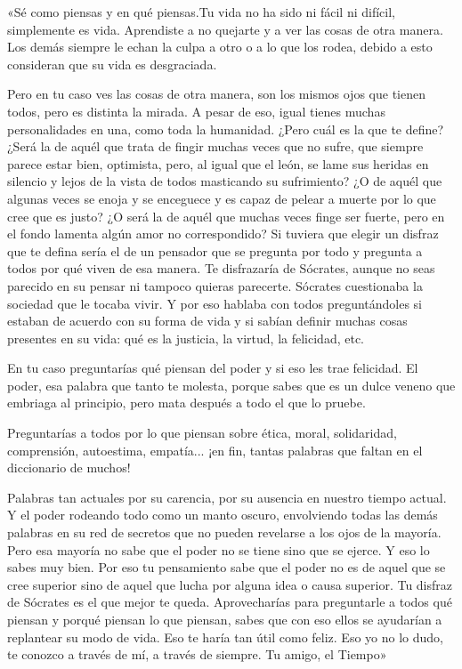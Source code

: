 \documentclass[11pt,twoside,openright,a5paper]{book}
\begin{document}
«Sé como piensas y en qué piensas.Tu vida no ha sido ni fácil ni difícil, simplemente es vida. Aprendiste a no quejarte y a ver las cosas de otra manera. Los demás siempre le echan la culpa a otro o a lo que los rodea, debido a esto consideran que su vida es desgraciada.

Pero en tu caso ves las cosas de otra manera, son los mismos ojos que tienen todos, pero es distinta la mirada. A pesar de eso, igual tienes muchas personalidades en una, como toda la humanidad. ¿Pero cuál es la que te define? ¿Será la de aquél que trata de fingir muchas veces que no sufre, que siempre parece estar bien, optimista, pero, al igual que el león, se lame sus heridas en silencio y lejos de la vista de todos masticando su sufrimiento? ¿O de aquél que algunas veces se enoja y se enceguece y es capaz de pelear a muerte por lo que cree que es justo? ¿O será la de aquél que muchas veces finge ser fuerte, pero en el fondo lamenta algún amor no correspondido? Si tuviera que elegir un disfraz que te defina sería el de un pensador que se pregunta por todo y pregunta a todos por qué viven de esa manera. Te disfrazaría de Sócrates, aunque no seas parecido en su pensar ni tampoco quieras parecerte. Sócrates cuestionaba la sociedad que le tocaba vivir. Y por eso hablaba con todos preguntándoles si estaban de acuerdo con su forma de vida y si sabían definir muchas cosas presentes en su vida: qué es la justicia, la virtud, la felicidad, etc.

En tu caso preguntarías qué piensan del poder y si eso les trae felicidad. El poder, esa palabra que tanto te molesta, porque sabes que es un dulce veneno que embriaga al principio, pero mata después a todo el que lo pruebe.

Preguntarías a todos por lo que piensan sobre ética, moral, solidaridad, comprensión, autoestima, empatía... ¡en fin, tantas palabras que faltan en el diccionario de muchos! 

Palabras tan actuales por su carencia, por su ausencia en nuestro tiempo actual. Y el poder rodeando todo como un manto oscuro, envolviendo todas las demás palabras en su red de secretos que no pueden revelarse a los ojos de la mayoría. Pero esa mayoría no sabe que el poder no se tiene sino que se ejerce. Y eso lo sabes muy bien. Por eso tu pensamiento sabe que el poder no es de aquel que se cree superior sino de aquel que lucha por alguna idea o causa superior. Tu disfraz de Sócrates es el que mejor te queda. Aprovecharías para preguntarle a todos qué piensan y porqué piensan lo que piensan, sabes que con eso ellos se ayudarían a replantear  su modo de vida. Eso te haría tan útil como feliz.  Eso yo no lo dudo, te conozco a través de mí, a través de  siempre. Tu amigo, el Tiempo»
\end{document}

